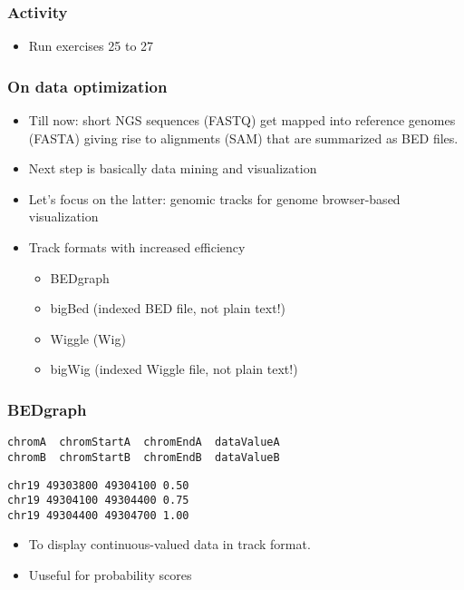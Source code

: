\documentclass{beamer}
\begin{document}
\begin{frame}
  \frametitle{Activity}
  \begin{itemize}
  \item Run exercises 25 to 27
  \end{itemize}
\end{frame}




\begin{frame}
  \frametitle{On data optimization}
  \begin{itemize}
  \item Till now: short NGS sequences (FASTQ) get mapped into reference genomes (FASTA) giving rise to alignments (SAM) that are summarized as BED files.
  \item Next step is basically data mining and visualization
  \item Let's focus on the latter: genomic tracks for genome browser-based visualization
  \item Track formats with increased efficiency
    \begin{itemize}
    \item BEDgraph
    \item bigBed (indexed BED file, not plain text!)
    \item Wiggle (Wig)
    \item bigWig (indexed Wiggle file, not plain text!)
    \end{itemize}
  \end{itemize}
\end{frame}


\begin{frame}[fragile]
\frametitle{BEDgraph}
\begin{verbatim}
chromA  chromStartA  chromEndA  dataValueA
chromB  chromStartB  chromEndB  dataValueB
\end{verbatim}
\begin{verbatim}
chr19 49303800 49304100 0.50
chr19 49304100 49304400 0.75
chr19 49304400 49304700 1.00
\end{verbatim}
\begin{itemize}
    \item To display continuous-valued data in track format.
    \item Uuseful for probability scores
    \end{itemize}
\end{frame}
\end{document}
